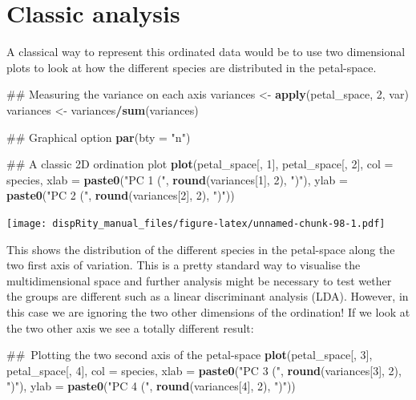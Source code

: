 \documentclass[]{book}
\newenvironment{Shaded}{\begin{snugshade}}{\end{snugshade}}
\newcommand{\KeywordTok}[1]{\textcolor[rgb]{0.13,0.29,0.53}{\textbf{#1}}}
\newcommand{\DataTypeTok}[1]{\textcolor[rgb]{0.13,0.29,0.53}{#1}}
\newcommand{\DecValTok}[1]{\textcolor[rgb]{0.00,0.00,0.81}{#1}}
\newcommand{\StringTok}[1]{\textcolor[rgb]{0.31,0.60,0.02}{#1}}
\newcommand{\OperatorTok}[1]{\textcolor[rgb]{0.81,0.36,0.00}{\textbf{#1}}}
\newcommand{\NormalTok}[1]{#1}
\theoremstyle{definition}
\theoremstyle{definition}
\theoremstyle{remark}
\begin{document}
\section{Classic analysis}\label{classic-analysis}

A classical way to represent this ordinated data would be to use two
dimensional plots to look at how the different species are distributed
in the petal-space.

\begin{Shaded}
\begin{Highlighting}[]
\NormalTok{## Measuring the variance on each axis}
\NormalTok{variances <-}\StringTok{ }\KeywordTok{apply}\NormalTok{(petal_space, }\DecValTok{2}\NormalTok{, var)}
\NormalTok{variances <-}\StringTok{ }\NormalTok{variances}\OperatorTok{/}\KeywordTok{sum}\NormalTok{(variances)}

\NormalTok{## Graphical option}
\KeywordTok{par}\NormalTok{(}\DataTypeTok{bty =} \StringTok{"n"}\NormalTok{)}

\NormalTok{## A classic 2D ordination plot}
\KeywordTok{plot}\NormalTok{(petal_space[, }\DecValTok{1}\NormalTok{], petal_space[, }\DecValTok{2}\NormalTok{], }\DataTypeTok{col =}\NormalTok{ species,}
    \DataTypeTok{xlab =} \KeywordTok{paste0}\NormalTok{(}\StringTok{"PC 1 ("}\NormalTok{, }\KeywordTok{round}\NormalTok{(variances[}\DecValTok{1}\NormalTok{], }\DecValTok{2}\NormalTok{), }\StringTok{")"}\NormalTok{),}
    \DataTypeTok{ylab =} \KeywordTok{paste0}\NormalTok{(}\StringTok{"PC 2 ("}\NormalTok{, }\KeywordTok{round}\NormalTok{(variances[}\DecValTok{2}\NormalTok{], }\DecValTok{2}\NormalTok{), }\StringTok{")"}\NormalTok{))}
\end{Highlighting}
\end{Shaded}

\texttt{[image: dispRity\_manual\_files/figure-latex/unnamed-chunk-98-1.pdf]}

This shows the distribution of the different species in the petal-space
along the two first axis of variation. This is a pretty standard way to
visualise the multidimensional space and further analysis might be
necessary to test wether the groups are different such as a linear
discriminant analysis (LDA). However, in this case we are ignoring the
two other dimensions of the ordination! If we look at the two other axis
we see a totally different result:

\begin{Shaded}
\begin{Highlighting}[]
\NormalTok{## Plotting the two second axis of the petal-space}
\KeywordTok{plot}\NormalTok{(petal_space[, }\DecValTok{3}\NormalTok{], petal_space[, }\DecValTok{4}\NormalTok{], }\DataTypeTok{col =}\NormalTok{ species,}
    \DataTypeTok{xlab =} \KeywordTok{paste0}\NormalTok{(}\StringTok{"PC 3 ("}\NormalTok{, }\KeywordTok{round}\NormalTok{(variances[}\DecValTok{3}\NormalTok{], }\DecValTok{2}\NormalTok{), }\StringTok{")"}\NormalTok{),}
    \DataTypeTok{ylab =} \KeywordTok{paste0}\NormalTok{(}\StringTok{"PC 4 ("}\NormalTok{, }\KeywordTok{round}\NormalTok{(variances[}\DecValTok{4}\NormalTok{], }\DecValTok{2}\NormalTok{), }\StringTok{")"}\NormalTok{))}
\end{Highlighting}
\end{Shaded}
\end{document}
